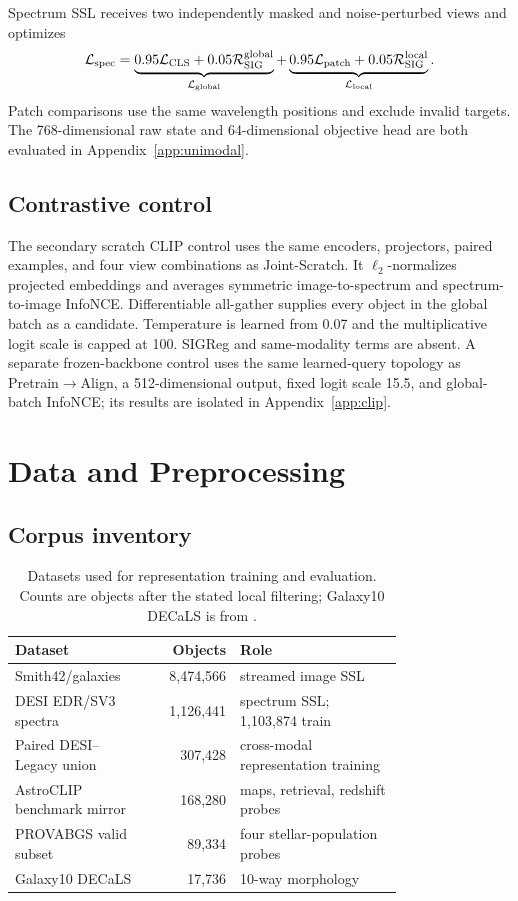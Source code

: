 \documentclass{article}
\newcommand{\prealign}{Pretrain$\rightarrow$Align}
\newcommand{\joint}{Joint-Scratch}
\begin{document}
Spectrum SSL receives two independently masked and noise-perturbed views and
optimizes
\[
\mathcal L_{\rm spec}
=\underbrace{0.95\mathcal L_{\rm CLS}+0.05\mathcal R_{\rm SIG}^{\rm global}}
_{\mathcal L_{\rm global}}
+\underbrace{0.95\mathcal L_{\rm patch}
+0.05\mathcal R_{\rm SIG}^{\rm local}}_{\mathcal L_{\rm local}} .
\]
Patch comparisons use the same wavelength positions and exclude invalid
targets.
The 768-dimensional raw state and 64-dimensional objective head are both
evaluated in Appendix~\ref{app:unimodal}.

\subsection{Contrastive control}

The secondary scratch CLIP control uses the same encoders, projectors, paired examples,
and four view combinations as \joint.
It $\ell_2$-normalizes projected embeddings and averages symmetric
image-to-spectrum and spectrum-to-image InfoNCE.
Differentiable all-gather supplies every object in the global batch as a
candidate.
Temperature is learned from 0.07 and the multiplicative logit scale is capped
at 100.
SIGReg and same-modality terms are absent.
A separate frozen-backbone control uses the same learned-query topology as
\prealign, a 512-dimensional output, fixed logit scale 15.5, and global-batch
InfoNCE; its results are isolated in Appendix~\ref{app:clip}.

\FloatBarrier
\section{Data and Preprocessing}
\label{app:data}

\subsection{Corpus inventory}

\begin{table}[h]
\centering
\caption{Datasets used for representation training and evaluation. Counts are
objects after the stated local filtering; Galaxy10 DECaLS is from
\citet{leung2024galaxy10}.}
\label{tab:data_inventory}
\small
\begin{tabular}{p{0.35\linewidth}rp{0.42\linewidth}}
\toprule
Dataset & Objects & Role\\
\midrule
Smith42/galaxies & 8,474,566 & streamed image SSL\\
DESI EDR/SV3 spectra & 1,126,441 & spectrum SSL; 1,103,874 train\\
Paired DESI--Legacy union & 307,428 & cross-modal representation training\\
AstroCLIP benchmark mirror & 168,280 & maps, retrieval, redshift probes\\
PROVABGS valid subset & 89,334 & four stellar-population probes\\
Galaxy10 DECaLS & 17,736 & 10-way morphology\\
\bottomrule
\end{tabular}
\end{table}
\end{document}
